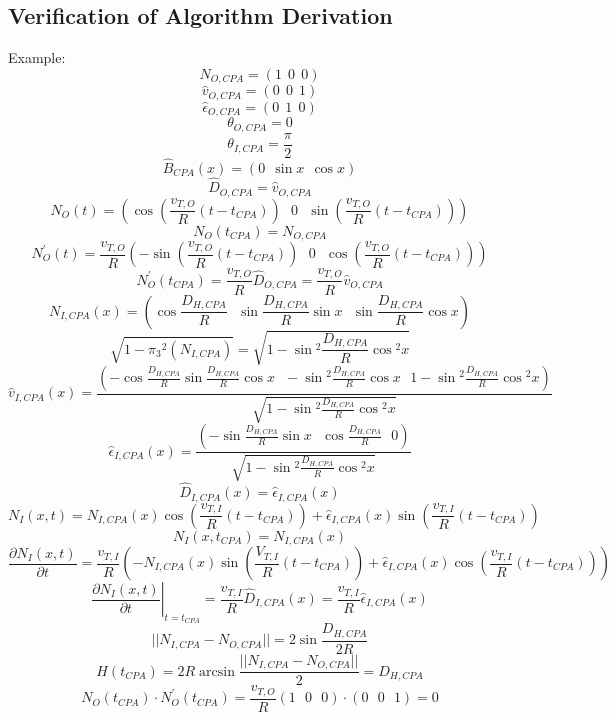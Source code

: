 
\begin{theappendices}

\chapter{Verification of Algorithm Derivation}
\label{chap:verification}
Example:
\[N_{O,CPA} = (1 \ \ 0 \ \ 0)\]
\[\hat{v}_{O,CPA} = (0 \ \ 0 \ \ 1)\]
\[\hat{\epsilon}_{O,CPA} = (0 \ \ 1 \ \ 0)\]
\[\theta_{O,CPA} = 0\]
\[\theta_{I,CPA} = \frac{\pi}{2}\]
\[\hat{B}_{CPA}(x) = (0 \ \ \sin{x} \ \ \cos{x})\]
\[\hat{D}_{O,CPA} = \hat{v}_{O,CPA}\]
\[N_{O}(t) = \left(\cos{\left(\frac{v_{T,O}}{R}(t-t_{CPA})\right)} \ \ \ 0 \ \ \ \sin{\left(\frac{v_{T,O}}{R}(t-t_{CPA})\right)}\right)\]
\[N_{O}(t_{CPA}) = N_{O,CPA}\]
\[N_{O}^{'}(t) = \frac{v_{T,O}}{R}\left(-\sin{\left(\frac{v_{T,O}}{R}(t-t_{CPA})\right)} \ \ \ 0 \ \ \ \cos{\left(\frac{v_{T,O}}{R}(t-t_{CPA})\right)}\right)\]
\[N_{O}^{'}(t_{CPA}) = \frac{v_{T,O}}{R}\hat{D}_{O,CPA} = \frac{v_{T,O}}{R} \hat{v}_{O,CPA}\]
\[N_{I,CPA}(x) = \left(\cos{\frac{D_{H,CPA}}{R}} \ \ \ \sin{\frac{D_{H,CPA}}{R}}\sin{x} \ \ \ \sin{\frac{D_{H,CPA}}{R}}\cos{x}\right)\]
\[\sqrt{1-\pi_{3}{}^2(N_{I,CPA})} = \sqrt{1-\sin{^2\frac{D_{H,CPA}}{R}}\cos{^2x}}\]
\[\hat{v}_{I,CPA}(x) = \frac{\left( -\cos{\frac{D_{H,CPA}}{R}}\sin{\frac{D_{H,CPA}}{R}}\cos{x} \ \ \ -\sin{^{2}\frac{D_{H,CPA}}{R}}\cos{x} \ \ \ 1-\sin{^{2}\frac{D_{H,CPA}}{R}}\cos{^{2}x} \right)}{\sqrt{1-\sin{^{2}\frac{D_{H,CPA}}{R}}\cos{^{2}x}}}\]
\[\hat{\epsilon}_{I,CPA}(x) = \frac{\left( -\sin{\frac{D_{H,CPA}}{R}}\sin{x} \ \ \ \cos{\frac{D_{H,CPA}}{R}} \ \ \ 0\right)}{\sqrt{1-\sin{^{2}\frac{D_{H,CPA}}{R}}\cos{^{2}x}}}\]
\[\hat{D}_{I,CPA}(x) = \hat{\epsilon}_{I,CPA}(x)\]
\[N_{I}(x,t) = N_{I,CPA}(x)\cos{\left( \frac{v_{T,I}}{R}(t-t_{CPA}) \right) + \hat{\epsilon}_{I,CPA}(x)\sin{\left( \frac{v_{T,I}}{R}(t-t_{CPA}) \right)}}\]
\[N_{I}(x,t_{CPA}) = N_{I,CPA}(x)\]
\[\frac{\partial N_{I}(x,t)}{\partial t} = \frac{v_{T,I}}{R} \left( -N_{I,CPA}(x) \sin{\left( \frac{V_{T,I}}{R}(t-t_{CPA}) \right) + \hat{\epsilon}_{I,CPA}(x)\cos{\left( \frac{v_{T,I}}{R}(t-t_{CPA}) \right)}} \right)\]
\[\left. \frac{\partial N_{I}(x,t)}{\partial t}\right|_{t=t_{CPA}} = \frac{v_{T,I}}{R}\hat{D}_{I,CPA}(x) = \frac{v_{T,I}}{R}\hat{\epsilon}_{I,CPA}(x)\]
\[||N_{I,CPA}-N_{O,CPA}|| = 2\sin{\frac{D_{H,CPA}}{2R}}\]
\[H(t_{CPA}) = 2R\arcsin{\frac{||N_{I,CPA}-N_{O,CPA}||}{2}} = D_{H,CPA}\]
\[N_{O}(t_{CPA}) \cdot N^{'}_{O}(t_{CPA}) = \frac{v_{T,O}}{R}(1 \ \ \ 0 \ \ \ 0) \cdot (0 \ \ \ 0 \ \ \ 1) = 0\]
\begin{equation*}
    \begin{aligned}

\end{aligned}
\end{equation*}
\end{theappendices}
